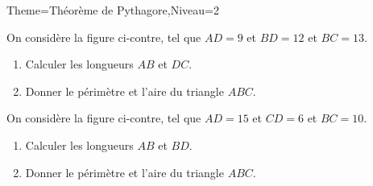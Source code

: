 \documentclass[a4paper,12pt]{article}
\begin{document}
\begin{Maquette}[Fiche]{Theme=Théorème de Pythagore,Niveau=2}

\begin{exercice}%
\begin{minipage}{0.65\linewidth}
On considère la figure ci-contre, tel que $AD=9$ et $BD=12$ et $BC=13$.
\begin{enumerate}
\item Calculer les longueurs $AB$ et $DC$.
\item Donner le périmètre et l'aire du triangle $ABC$.
\end{enumerate}
\end{minipage}%
\begin{minipage}{0.35\linewidth}
\end{minipage}
\end{exercice}

\begin{exercice}
\begin{minipage}{0.62\linewidth}
On considère la figure ci-contre, tel que $AD=15$ et $CD=6$ et $BC=10$.
\begin{enumerate}
\item Calculer les longueurs $AB$ et $BD$.
\item Donner le périmètre et l'aire du triangle $ABC$.
\end{enumerate}
\end{minipage}%
\begin{minipage}{0.38\linewidth}
\end{minipage}
\end{exercice}


\end{Maquette}
\end{document}
